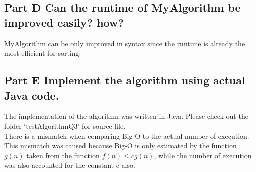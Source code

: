 \documentclass{article}
\begin{document}
\subsection*{Part D\: Can the runtime of MyAlgorithm be improved easily? how?}
MyAlgorithm can be only improved in syntax since the runtime is already the most efficient for sorting.

\subsection*{Part E\: Implement the algorithm using actual Java code.}
The implementation of the algorithm was written in Java. Please check out the folder `testAlgorithmQ3' for source file.
\\
There is a mismatch when comparing Big-O to the actual number of execution. This mismatch was caused because Big-O is only estimated by the function $g(n)$ taken from the function $f(n)\leq cg(n)$, while the number of execution was also accounted for the constant c also.
\end{document}

